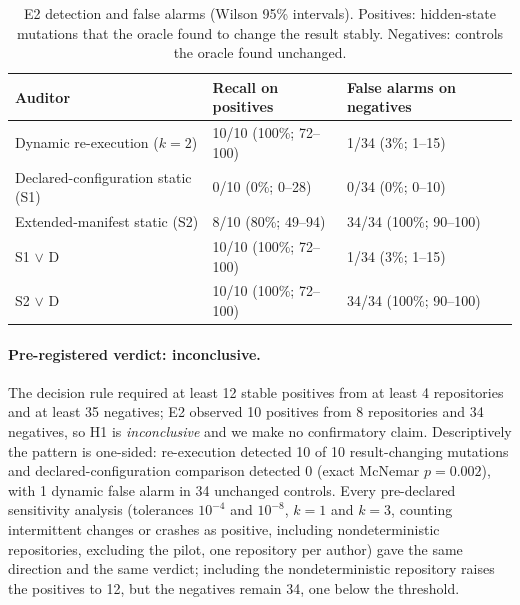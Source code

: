 \begin{table}[h]
\centering\small
\caption{E2 detection and false alarms (Wilson 95\% intervals). Positives: hidden-state mutations that the oracle found to change the result stably. Negatives: controls the oracle found unchanged.}
\label{tab:e2}
\begin{tabular}{lll}
\toprule
Auditor & Recall on positives & False alarms on negatives \\
\midrule
Dynamic re-execution ($k=2$) & 10/10 (100\%; 72--100) & 1/34 (3\%; 1--15) \\
Declared-configuration static (S1) & 0/10 (0\%; 0--28) & 0/34 (0\%; 0--10) \\
Extended-manifest static (S2) & 8/10 (80\%; 49--94) & 34/34 (100\%; 90--100) \\
S1 $\lor$ D & 10/10 (100\%; 72--100) & 1/34 (3\%; 1--15) \\
S2 $\lor$ D & 10/10 (100\%; 72--100) & 34/34 (100\%; 90--100) \\
\bottomrule
\end{tabular}
\end{table}

\paragraph{Pre-registered verdict: inconclusive.} The decision rule required at least 12 stable positives from at least 4 repositories and at least 35 negatives; E2 observed 10 positives from 8 repositories and 34 negatives, so H1 is \emph{inconclusive} and we make no confirmatory claim. Descriptively the pattern is one-sided: re-execution detected 10 of 10 result-changing mutations and declared-configuration comparison detected 0 (exact McNemar $p=0.002$), with 1 dynamic false alarm in 34 unchanged controls. Every pre-declared sensitivity analysis (tolerances $10^{-4}$ and $10^{-8}$, $k=1$ and $k=3$, counting intermittent changes or crashes as positive, including nondeterministic repositories, excluding the pilot, one repository per author) gave the same direction and the same verdict; including the nondeterministic repository raises the positives to 12, but the negatives remain 34, one below the threshold.


